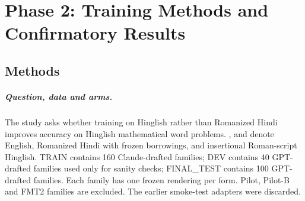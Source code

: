 
\chapter{Phase 2: Training Methods and Confirmatory Results}
\label{ch:phase2}


\section{Methods}
\label{sec:phase2-methods}

\paragraph{Question, data and arms.}
The study asks whether training on Hinglish rather than Romanized Hindi improves accuracy on Hinglish mathematical word problems. ,  and  denote English, Romanized Hindi with frozen borrowings, and insertional Roman-script Hinglish. TRAIN contains 160 Claude-drafted families; DEV contains 40 GPT-drafted families used only for sanity checks; FINAL\_TEST contains 100 GPT-drafted families. Each family has one frozen rendering per form. Pilot, Pilot-B and FMT2 families are excluded. The earlier smoke-test adapters were discarded.

